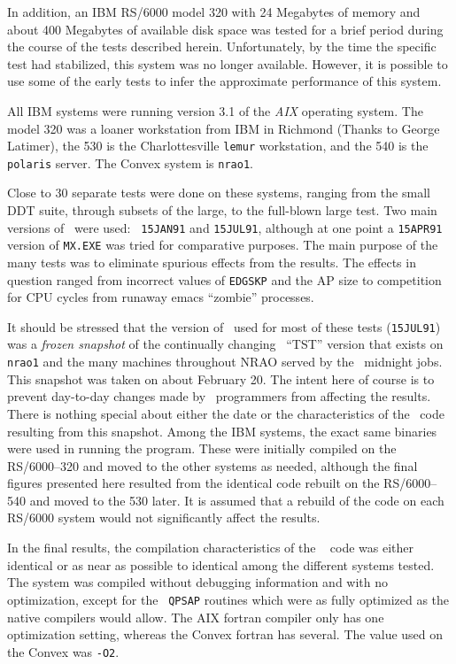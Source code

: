 \noindent In addition, an IBM RS/6000 model 320 with 24 Megabytes of
memory and about 400 Megabytes of available disk space was tested for
a brief period during the course of the tests described herein.
Unfortunately, by the time the specific test had stabilized, this
system was no longer available.  However, it is possible to use some
of the early tests to infer the approximate performance of this
system.

All IBM systems were running version 3.1 of the {\it AIX} operating
system.  The model 320 was a loaner workstation from IBM in Richmond
(Thanks to George Latimer), the 530 is the Charlottesville {\tt lemur}
workstation, and the 540 is the {\tt polaris} server.  The Convex
system is {\tt nrao1}.

Close to 30 separate tests were done on these systems, ranging
from the small DDT suite, through subsets of the large, to the
full-blown large test.  Two main versions of \AIPS\ were used: {\tt
15JAN91} and {\tt 15JUL91}, although at one point a {\tt 15APR91}
version of {\tt MX.EXE} was tried for comparative purposes.
The main purpose of the many tests was to eliminate spurious
effects from the results.  The effects in question ranged from
incorrect values of {\tt EDGSKP} and the AP size to competition for
CPU cycles from runaway emacs ``zombie'' processes.

It should be stressed that the version of \AIPS\ used for most of
these tests ({\tt 15JUL91}) was a {\it frozen snapshot\/} of the
continually changing \AIPS\ ``TST'' version that exists on {\tt nrao1}
and the many machines throughout NRAO served by the \AIPS\ midnight
jobs.  This snapshot was taken on about February 20.  The intent here
of course is to prevent day-to-day changes made by \AIPS\ programmers
from affecting the results.  There is nothing special about either the
date or the characteristics of the \AIPS\ code resulting from this
snapshot.  Among the IBM systems, the exact same binaries were used in
running the program.  These were initially compiled on the
RS/6000--320 and moved to the other systems as needed, although the
final figures presented here resulted from the identical code rebuilt
on the RS/6000--540 and moved to the 530 later.  It is assumed that a
rebuild of the code on each RS/6000 system would not significantly
affect the results.

In the final results, the compilation characteristics of the \AIPS\ %
code was either identical or as near as possible to identical among
the different systems tested.  The system was compiled without
debugging information and with no optimization, except for the {\tt
QPSAP} routines which were as fully optimized as the native compilers
would allow.  The AIX fortran compiler only has one optimization
setting, whereas the Convex fortran has several.  The value used on
the Convex was {\tt -O2}.

